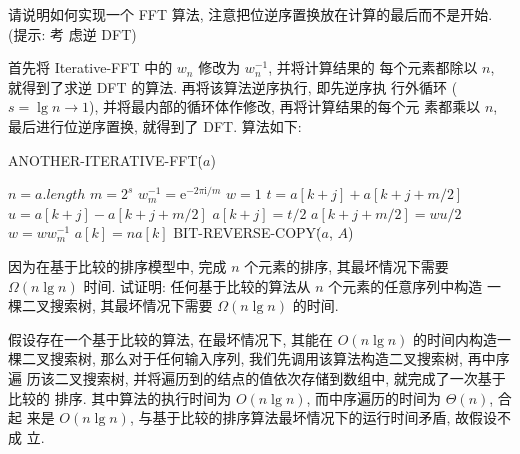 \documentclass[boxes]{homework}
\begin{document}
\begin{problem}
请说明如何实现一个 FFT 算法, 注意把位逆序置换放在计算的最后而不是开始. (提示: 考
虑逆 DFT)
\end{problem}
\begin{solution}
    首先将 {\sc Iterative-FFT} 中的 $w_{n}$ 修改为 $w_{n}^{-1}$, 并将计算结果的
    每个元素都除以 $n$, 就得到了求逆 DFT 的算法. 再将该算法逆序执行, 即先逆序执
    行外循环 ($s = \lg n \to 1$), 并将最内部的循环体作修改, 再将计算结果的每个元
    素都乘以 $n$, 最后进行位逆序置换, 就得到了 DFT\@. 算法如下:
    \begin{algo}
        \caption{ANOTHER-ITERATIVE-FFT\.($a$)}
        $n = a.length$\;
         {
        $m = 2^{s}$\;
        $w_{m}^{-1} = \mathrm{e}^{- 2\pi \mathrm{i} / m}$
         {
            $w = 1$\;
             {
                $t = a[k + j] + a[k + j + m / 2]$\;
                $u = a[k + j] - a[k + j + m / 2]$\;
                $a[k + j] = t / 2$\;
                $a[k + j + m / 2] = w u / 2$\;
                $w = w w_{m}^{-1}$\;
            }
        }
         {
            $a[k] = na[k]$\;
        }
        BIT-REVERSE-COPY\.($a$, $A$)\;
        }
    \end{algo}
\end{solution}

\begin{problem}
因为在基于比较的排序模型中, 完成 $n$ 个元素的排序, 其最坏情况下需要
$\Omega(n\lg n)$ 时间. 试证明: 任何基于比较的算法从 $n$ 个元素的任意序列中构造
一棵二叉搜索树, 其最坏情况下需要 $\Omega(n\lg n)$ 的时间.
\end{problem}
\begin{solution}
    假设存在一个基于比较的算法, 在最坏情况下, 其能在 $O(n \lg n)$ 的时间内构造一
    棵二叉搜索树, 那么对于任何输入序列, 我们先调用该算法构造二叉搜索树, 再中序遍
    历该二叉搜索树, 并将遍历到的结点的值依次存储到数组中, 就完成了一次基于比较的
    排序. 其中算法的执行时间为 $O(n\lg n)$, 而中序遍历的时间为 $\Theta(n)$, 合起
    来是 $O(n\lg n)$, 与基于比较的排序算法最坏情况下的运行时间矛盾, 故假设不成
    立.
\end{solution}
\end{document}
